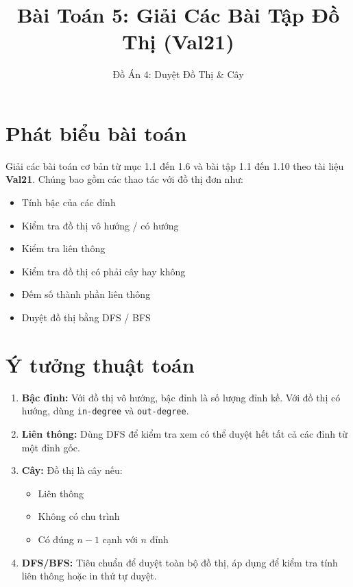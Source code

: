 \documentclass[12pt]{article}
\title{Bài Toán 5: Giải Các Bài Tập Đồ Thị (Val21)}
\author{Đồ Án 4: Duyệt Đồ Thị \& Cây}
\date{}
\begin{document}
\maketitle

\section*{Phát biểu bài toán}
Giải các bài toán cơ bản từ mục 1.1 đến 1.6 và bài tập 1.1 đến 1.10 theo tài liệu \textbf{Val21}.  
Chúng bao gồm các thao tác với đồ thị đơn như:
\begin{itemize}
    \item Tính bậc của các đỉnh
    \item Kiểm tra đồ thị vô hướng / có hướng
    \item Kiểm tra liên thông
    \item Kiểm tra đồ thị có phải cây hay không
    \item Đếm số thành phần liên thông
    \item Duyệt đồ thị bằng DFS / BFS
\end{itemize}

\section*{Ý tưởng thuật toán}
\begin{enumerate}
    \item \textbf{Bậc đỉnh:} Với đồ thị vô hướng, bậc đỉnh là số lượng đỉnh kề. Với đồ thị có hướng, dùng \texttt{in-degree} và \texttt{out-degree}.
    \item \textbf{Liên thông:} Dùng DFS để kiểm tra xem có thể duyệt hết tất cả các đỉnh từ một đỉnh gốc.
    \item \textbf{Cây:} Đồ thị là cây nếu:
        \begin{itemize}
            \item Liên thông
            \item Không có chu trình
            \item Có đúng \( n-1 \) cạnh với \( n \) đỉnh
        \end{itemize}
    \item \textbf{DFS/BFS:} Tiêu chuẩn để duyệt toàn bộ đồ thị, áp dụng để kiểm tra tính liên thông hoặc in thứ tự duyệt.
\end{enumerate}
\end{document}
